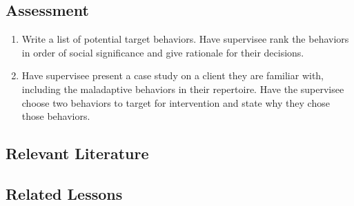 \subsection{Assessment}
\begin{enumerate}
\item Write a list of potential target behaviors. Have supervisee rank the behaviors in order of social significance and give rationale for their decisions.
\item Have supervisee present a case study on a client they are familiar with, including the maladaptive behaviors in their repertoire. Have the supervisee choose two behaviors to target for intervention and state why they chose those behaviors.
\end{enumerate}
%
\subsection{Relevant Literature}
\begin{refsection}
\nocite{ayllon1968token,
        cooper2007applied,
        hawkins1984meaningful,
        hawkins1986selection,
        rosales1997behavioral}
\printbibliography[heading=none]
\end{refsection}
\subsection{Related Lessons}
\fourbOne{}\\ 
\fourgThree{}\\
\fourgFive{}\\
\fouriOne{}\\
\fourjOne{}\\
\fourjFive{}\\
\fourjEight{}\\
\fourjTen{}\\
\fourjThirteen{}\\
\fourFKTen{}\\
